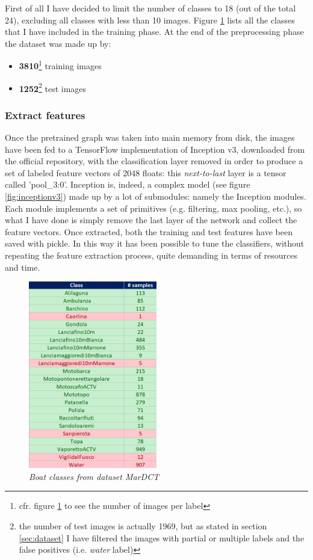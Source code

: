 \documentclass[12pt]{article}
\begin{document}
First of all I have decided to limit the number of classes to 18 (out of the total 24), excluding all classes with less than 10 images. Figure \ref{fig:labels} lists all the classes that I have included in the training phase. At the end of the preprocessing phase the dataset was made up by:
\begin{itemize}
	\item \textbf{3810}\footnote{cfr. figure \ref{fig:labels} to see the number of images per label} training images
	\item \textbf{1252}\footnote{the number of test images is actually 1969, but as stated in section \ref{sec:dataset} I have filtered the images with partial or multiple labels and the false positives (i.e. \textit{water} label)} test images
\end{itemize}

\subsubsection{Extract features}
Once the pretrained graph was taken into main memory from disk, the images have been fed to a TensorFlow implementation of Inception v3, downloaded from the official repository, with the classification layer removed in order to produce a set of labeled feature vectors of 2048 floats: this \textit{next-to-last} layer is a tensor called 'pool\_3:0'. Inception is, indeed, a complex model (see figure \ref{fig:inceptionv3}) made up by a lot of submodules: namely the Inception modules. Each module implements a set of primitives (e.g. filtering, max pooling, etc.), so what I have done is simply remove the last layer of the network and collect the feature vectors. Once extracted, both the training and test features have been saved with pickle. In this way it has been possible to tune the classifiers, without repeating the feature extraction process, quite demanding in terms of resources and time.
\begin{figure}[!hb]
	\centering %
	\includegraphics[width=0.5\textwidth]{labels.png} %
	\caption{\textit{Boat classes from dataset MarDCT}} %
	\label{fig:labels}
\end{figure}
\end{document}
